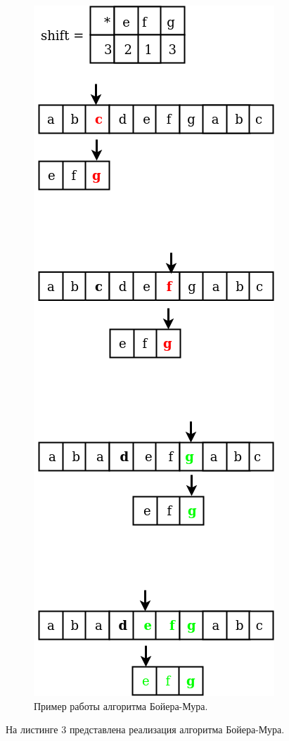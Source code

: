 \documentclass[12pt]{report}
\begin{document}
\begin{figure}[H]	
	{
		\centering
		\includegraphics[scale=0.40]{3.png}
		\caption{Пример работы алгоритма Бойера-Мура.}
		\label{pic:ant_schema}
	}
\end{figure}
На листинге 3 представлена реализация алгоритма Бойера-Мура.
\end{document}
